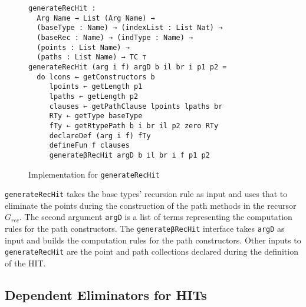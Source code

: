 \documentclass[sigplan,10pt]{acmart}
\begin{document}
\begin{figure}
\begin{center}
\begingroup
\begin{Verbatim}
generateRecHit : 
  Arg Name → List (Arg Name) →
  (baseType : Name) → (indexList : List Nat) →
  (baseRec : Name) → (indType : Name) →
  (points : List Name) → 
  (paths : List Name) → TC ⊤
generateRecHit (arg i f) argD b il br i p1 p2 =
  do lcons ← getConstructors b
     lpoints ← getLength p1
     lpaths ← getLength p2
     clauses ← getPathClause lpoints lpaths br
     RTy ← getType baseType
     fTy ← getRtypePath b i br il p2 zero RTy
     declareDef (arg i f) fTy
     defineFun f clauses
     generateβRecHit argD b il br i f p1 p2
\end{Verbatim}
\endgroup
\end{center}
\caption{Implementation for {\tt generateRecHit}}
\label{fig:generateRecHit}
\end{figure}
\normalsize

{\tt generateRecHit} takes the base types' recursion rule as input and uses that to eliminate the points during the construction of the path methods in the recursor $G_{rec}$.
The second argument {\tt argD} is a list of terms representing the computation rules for the path constructors.
The {\tt generateβRecHit} interface takes {\tt argD} as input and builds the computation rules for the path constructors. Other inputs to {\tt generateRecHit} are the point and path collections declared during the definition of the HIT.

\subsection{Dependent Eliminators for HITs}
\label{sec:sec4.3}
\end{document}
